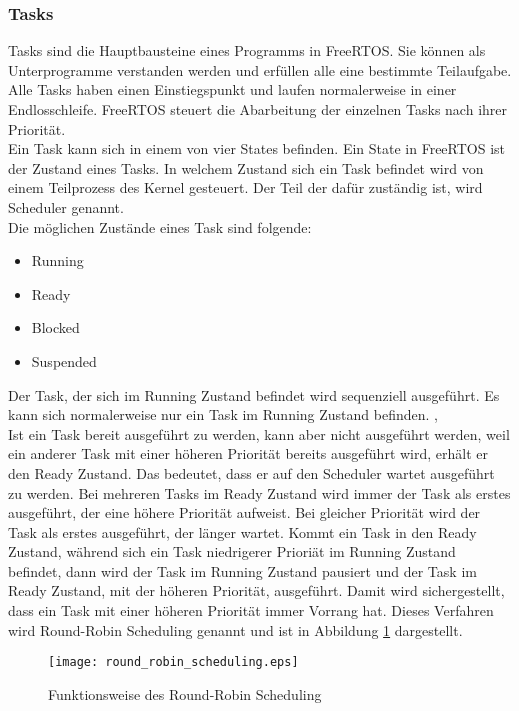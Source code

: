 \subsubsection{Tasks}
Tasks sind die Hauptbausteine eines Programms in FreeRTOS. Sie können als Unterprogramme verstanden werden und erfüllen alle eine bestimmte Teilaufgabe. Alle Tasks haben einen Einstiegspunkt und laufen normalerweise in einer Endlosschleife. FreeRTOS steuert die Abarbeitung der einzelnen Tasks nach ihrer Priorität.
\cite[][S. 46]{FRTOSManual}
\\
Ein Task kann sich in einem von vier States befinden. Ein State in FreeRTOS ist der Zustand eines Tasks. In welchem Zustand sich ein Task befindet wird von einem Teilprozess des Kernel gesteuert. Der Teil der dafür zuständig ist, wird Scheduler genannt.
\\
Die möglichen Zustände eines Task sind folgende:

\begin{itemize}
\itemsep0em
\item Running
\item Ready
\item Blocked
\item Suspended
\end{itemize}

\noindent
Der Task, der sich im Running Zustand befindet wird sequenziell ausgeführt. Es kann sich normalerweise nur ein Task im Running Zustand befinden.
\cite[][S. 65f]{FRTOSManual},
\cite{esp-idf_FRTOS}
\\
Ist ein Task bereit ausgeführt zu werden, kann aber nicht ausgeführt werden, weil ein anderer Task mit einer höheren Priorität bereits ausgeführt wird, erhält er den Ready Zustand. Das bedeutet, dass er auf den Scheduler wartet ausgeführt zu werden. Bei mehreren Tasks im Ready Zustand wird immer der Task als erstes ausgeführt, der eine höhere Priorität aufweist. Bei gleicher Priorität wird der Task als erstes ausgeführt, der länger wartet. Kommt ein Task in den Ready Zustand, während sich ein Task niedrigerer Prioriät im Running Zustand befindet, dann wird der Task im Running Zustand pausiert und der Task im Ready Zustand, mit der höheren Priorität, ausgeführt. Damit wird sichergestellt, dass ein Task mit einer höheren Priorität immer Vorrang hat. Dieses Verfahren wird Round-Robin Scheduling genannt und ist in Abbildung \ref{round-robin} dargestellt.
\cite[][S. 59]{FRTOSManual}

\begin{figure}[h]
\vspace{12pt}
\centering
\texttt{[image: round\_robin\_scheduling.eps]}
\caption{Funktionsweise des Round-Robin Scheduling}
\label{round-robin}
\vspace{12pt}
\end{figure}

